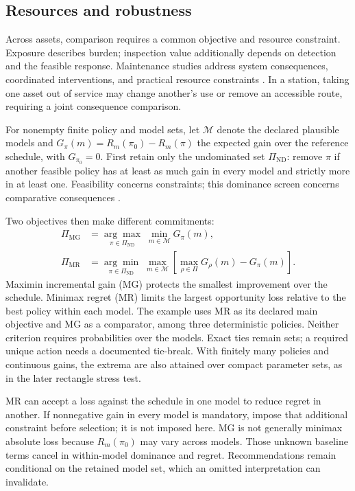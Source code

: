 \documentclass[symmetry,article,submit,pdftex,oneauthor]{Definitions/mdpi}
\begin{document}
\subsection{Resources and robustness}

Across assets, comparison requires a common objective and resource constraint. Exposure describes burden; inspection value additionally depends on detection and the feasible response. Maintenance studies address system consequences, coordinated interventions, and practical resource constraints \citep{Yeter2020,Yang2024,DAriano20191315,Enjavimadar2022}. In a station, taking one asset out of service may change another's use or remove an accessible route, requiring a joint consequence comparison.

For nonempty finite policy and model sets, let $\mathcal M$ denote the declared plausible models and $G_\pi(m)=R_m(\pi_0)-R_m(\pi)$ the expected gain over the reference schedule, with $G_{\pi_0}=0$. First retain only the undominated set $\Pi_{\mathrm{ND}}$: remove $\pi$ if another feasible policy has at least as much gain in every model and strictly more in at least one. Feasibility concerns constraints; this dominance screen concerns comparative consequences \citep{Troffaes2007ImpreciseDecisions}.

Two objectives then make different commitments:
\begin{equation}
\begin{aligned}
\Pi_{\mathrm{MG}}&=\underset{\pi\in\Pi_{\mathrm{ND}}}{\arg\max}\;\min_{m\in\mathcal M}G_\pi(m),\\
\Pi_{\mathrm{MR}}&=\underset{\pi\in\Pi_{\mathrm{ND}}}{\arg\min}\;\max_{m\in\mathcal M}
\left[\max_{\rho\in\Pi}G_\rho(m)-G_\pi(m)\right].
\end{aligned}
\label{eq:selection}
\end{equation}
Maximin incremental gain (MG) protects the smallest improvement over the schedule. Minimax regret (MR) limits the largest opportunity loss relative to the best policy within each model. The example uses MR as its declared main objective and MG as a comparator, among three deterministic policies. Neither criterion requires probabilities over the models. Exact ties remain sets; a required unique action needs a documented tie-break. With finitely many policies and continuous gains, the extrema are also attained over compact parameter sets, as in the later rectangle stress test.

MR can accept a loss against the schedule in one model to reduce regret in another. If nonnegative gain in every model is mandatory, impose that additional constraint before selection; it is not imposed here. MG is not generally minimax absolute loss because $R_m(\pi_0)$ may vary across models. Those unknown baseline terms cancel in within-model dominance and regret. Recommendations remain conditional on the retained model set, which an omitted interpretation can invalidate.
\end{document}
